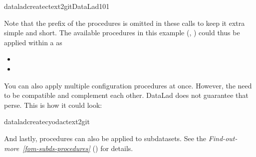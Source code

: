 \begin{sphinxVerbatim}[commandchars=\\\{\}]
dataladcreate\PYGZhy{}ctext2gitDataLad\PYGZhy{}101
\end{sphinxVerbatim}

\sphinxAtStartPar
Note that the  prefix of the procedures is omitted in these
calls to keep it extra simple and short. The
available procedures in this example (, )
could thus be applied within a  as
\begin{itemize}
\item {} 
\sphinxAtStartPar
{}

\item {} 
\sphinxAtStartPar
{}

\end{itemize}

\ignorespaces 
\sphinxAtStartPar
You can also apply multiple configuration procedures at once. However,
the need to be compatible and complement each other. DataLad does not
guarantee that per\sphinxhyphen{}se. This is how it could look:

\begin{sphinxVerbatim}[commandchars=\\\{\}]
dataladcreate\PYGZhy{}cyoda\PYGZhy{}ctext2git
\end{sphinxVerbatim}

\sphinxAtStartPar
And lastly, procedures can also be applied to subdatasets. See the
\textit{Find-out-more}~{\findoutmoreiconinline}\textit{\ref{fom-subds-procedures}} {\hyperref[\detokenize{basics/101-124-procedures:fom-subds-procedures}]{}} () for details.

